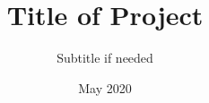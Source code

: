 \newcommand{\Faculty}{Faculty of Engineering}
\newcommand{\Department}{Department of Civil Engineering}
\newcommand{\ThesisType}{Final Year Project Report}
\newcommand{\DegreeType}{Bachelor of Civil Engineering}

\newcommand{\AuthorA}{LastName1, FirstNames1}	%
\newcommand{\AuthorAID}{Registration Number}	%
\newcommand{\AuthorB}{LastName2, FirstNames2}  	%
\newcommand{\AuthorBID}{Registration Number}
\newcommand{\SupervisorA}{First supervisor}	%
\newcommand{\SupervisorB}{Second supervisor}	%

\title{Title of Project}			%
\subtitle{Subtitle if needed}		%
\date{May 2020}						%